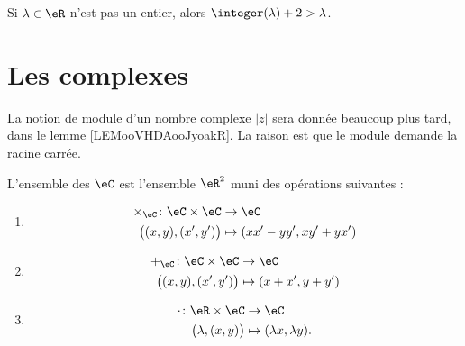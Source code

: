 \begin{lemma}       \label{LEMooMMSAooFiRkQd}
	Si \( \lambda\in \eR\) n'est pas un entier, alors \( \integer(\lambda)+2>\lambda\).
\end{lemma}


\section{Les complexes}

La notion de module d'un nombre complexe \( | z |\) sera donnée beaucoup plus tard, dans le lemme \ref{LEMooVHDAooJyoakR}. La raison est que le module demande la racine carrée.

\begin{definition}
	L'ensemble des  \( \eC\) est l'ensemble \( \eR^2\) muni des opérations suivantes :
	\begin{enumerate}
		\item
		      \begin{equation}        \label{EQooIJWOooZBiKEW}
			      \begin{aligned}
				      \times_{\eC}\colon \eC\times \eC & \to \eC                    \\
				      \big( (x,y),(x',y') \big)        & \mapsto (xx'-yy', xy'+yx')
			      \end{aligned}
		      \end{equation}
		\item
		      \begin{equation}
			      \begin{aligned}
				      +_{\eC}\colon \eC\times \eC & \to \eC              \\
				      \big( (x,y),(x',y') \big)   & \mapsto (x+x', y+y')
			      \end{aligned}
		      \end{equation}
		\item
		      \begin{equation}
			      \begin{aligned}
				      \cdot\colon \eR\times \eC & \to \eC                         \\
				      \big( \lambda,(x,y) \big) & \mapsto (\lambda x, \lambda y).
			      \end{aligned}
		      \end{equation}
	\end{enumerate}
\end{definition}

